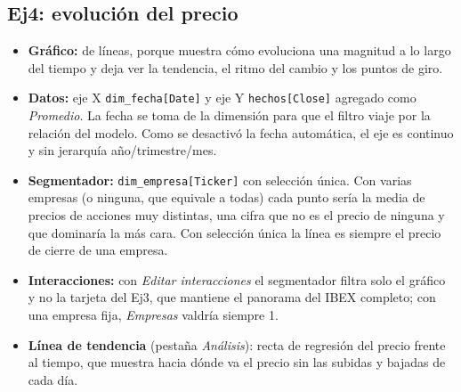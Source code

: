 \documentclass[11pt,a4paper]{article}
\newcommand{\code}[1]{\texttt{#1}}
\begin{document}
\subsection*{Ej4: evolución del precio}
\begin{itemize}
    \item \textbf{Gráfico:} de líneas, porque muestra cómo evoluciona una magnitud a lo largo del tiempo y deja ver la tendencia, el ritmo del cambio y los puntos de giro.
    \item \textbf{Datos:} eje X \code{dim\_fecha[Date]} y eje Y \code{hechos[Close]} agregado como \textit{Promedio}. La fecha se toma de la dimensión para que el filtro viaje por la relación del modelo. Como se desactivó la fecha automática, el eje es continuo y sin jerarquía año/trimestre/mes.
    \item \textbf{Segmentador:} \code{dim\_empresa[Ticker]} con selección única. Con varias empresas (o ninguna, que equivale a todas) cada punto sería la media de precios de acciones muy distintas, una cifra que no es el precio de ninguna y que dominaría la más cara. Con selección única la línea es siempre el precio de cierre de una empresa.
    \item \textbf{Interacciones:} con \textit{Editar interacciones} el segmentador filtra solo el gráfico y no la tarjeta del Ej3, que mantiene el panorama del IBEX completo; con una empresa fija, \textit{Empresas} valdría siempre 1.
    \item \textbf{Línea de tendencia} (pestaña \textit{Análisis}): recta de regresión del precio frente al tiempo, que muestra hacia dónde va el precio sin las subidas y bajadas de cada día.
\end{itemize}
\end{document}
